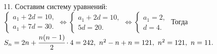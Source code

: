 11. Составим систему уравнений: $\begin{cases}a_1+2d=10,\\a_1+7d=30.\end{cases}\Leftrightarrow\begin{cases}a_1+2d=10,\\5d=20.\end{cases}
\Leftrightarrow\begin{cases}a_1=2,\\d=4.\end{cases}$ Тогда $S_n=2n+\cfrac{n(n-1)}{2}\cdot4=242,\ n^2-n+n=121,\ n^2=121,\ n=11.$\\
